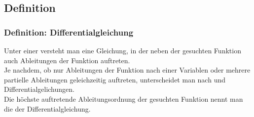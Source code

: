 \subsection{Definition}
%
\begin{frame}\frametitle{Definition: Differentialgleichung}
Unter einer  versteht man eine Gleichung, in der neben der gesuchten Funktion auch Ableitungen der Funktion auftreten.\\
Je nachdem, ob nur Ableitungen der Funktion nach einer Variablen oder mehrere partielle Ableitungen geleichzeitig auftreten, unterscheidet man nach  und  Differentialgelichungen.\\
Die höchste auftretende Ableitungsordnung der gesuchten Funktion nennt man die  der Differentialgleichung.


\end{frame}
%
